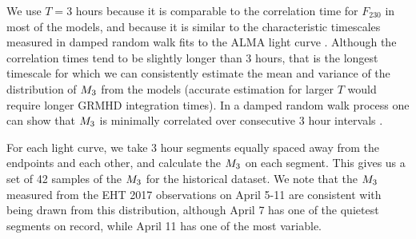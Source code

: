 We use $T = 3$ hours because it is comparable to the correlation time for $F_{230}$ in most of the models, and because it is similar to the characteristic timescales measured in damped random walk fits to the ALMA light curve \citep[see Table 10 of][]{Wielgus2022}.  Although the correlation times tend to be slightly longer than 3 hours, that is the longest timescale for which we can consistently estimate the mean and variance of the distribution of $M_{3}$ from the models (accurate estimation for larger $T$ would require longer GRMHD integration times).  In a damped random walk process one can show that $M_{3}$ is minimally correlated over consecutive 3 hour intervals \citep{Lee_2022}.

For each light curve, we take 3 hour segments equally spaced away from the endpoints and each other, and calculate the $M_{3}$ on each segment. This gives us a set of 42 samples of the $M_{3}$ for the historical dataset. We note that the $M_{3}$ measured from the EHT 2017 observations on April 5-11 are consistent with being drawn from this distribution, although April 7 has one of the quietest segments on record, while April 11 has one of the most variable. 



